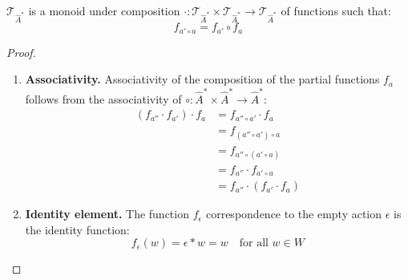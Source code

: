 \begin{proposition}\label{prp:T_is_monoid}
    $\mathcal{T}_{\hat{A}^{\ast}}$ is a monoid under composition $\cdot: \mathcal{T}_{\hat{A}^{\ast}} \times \mathcal{T}_{\hat{A}^{\ast}} \to \mathcal{T}_{\hat{A}^{\ast}}$ of functions such that:
    \begin{equation}
        f_{a' \circ a} = f_{a'} \circ f_{a}
    \end{equation}
\end{proposition}
\begin{proof}
    \begin{enumerate}[(1)]
        \item \textbf{Associativity.}
              Associativity of the composition of the partial functions $f_{a}$ follows from the associativity of $\circ: \hat{A}^{\ast} \times \hat{A}^{\ast} \to \hat{A}^{\ast}$:
              \begin{align}
                  (f_{a''} \cdot f_{a'}) \cdot f_{a} & = f_{a'' \circ a'} \cdot f_{a}       \\
                                                     & = f_{(a'' \circ a') \circ a}         \\
                                                     & = f_{a'' \circ (a' \circ a)}         \\
                                                     & = f_{a''} \cdot f_{a' \circ a}       \\
                                                     & = f_{a''} \cdot (f_{a'} \cdot f_{a})
              \end{align}
        \item \textbf{Identity element.}
              The function $f_{\epsilon}$ correspondence to the empty action $\epsilon$ is the identity function:
              \begin{equation}
                  f_{\epsilon}(w) = \epsilon \ast w = w \quad \text{for all $w \in W$}
              \end{equation}
    \end{enumerate}
\end{proof}

